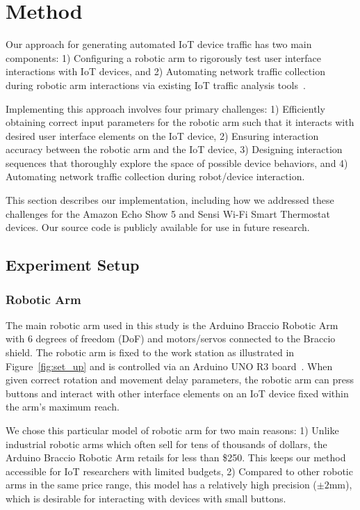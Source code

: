 \section{Method}
\label{sec:method}

Our approach for generating automated IoT device traffic has two main components: 1) Configuring a robotic arm to rigorously test user interface interactions with IoT devices, and 2) Automating network traffic collection during robotic arm interactions via existing IoT traffic analysis tools~\cite{iot_inspector}.

Implementing this approach involves four primary challenges: 1) Efficiently obtaining correct input parameters for the robotic arm such that it interacts with desired user interface elements on the IoT device, 2) Ensuring interaction accuracy between the robotic arm and the IoT device, 3) Designing interaction sequences that thoroughly explore the space of possible device behaviors, and 4) Automating network traffic collection during robot/device interaction. 

This section describes our implementation, including how we addressed these challenges for the Amazon Echo Show 5 and Sensi Wi-Fi Smart Thermostat devices. Our source code is publicly available for use in future research.

\subsection{Experiment Setup}
\label{sec:experiment-setup}
\subsubsection{Robotic Arm} The main robotic arm used in this study is the Arduino Braccio Robotic Arm~\cite{braccio} with 6 degrees of freedom (DoF) and motors/servos connected to the Braccio shield. The robotic arm is fixed to the work station as illustrated in Figure~\ref{fig:set_up} and is controlled via an Arduino UNO R3 board~\cite{r3}. 
When given correct rotation and movement delay parameters, the robotic arm can press buttons and interact with other interface elements on an IoT device fixed within the arm's maximum reach.

We chose this particular model of robotic arm for two main reasons: 1) Unlike industrial robotic arms which often sell for tens of thousands of dollars, the Arduino Braccio Robotic Arm retails for less than \$250. This keeps our method accessible for IoT researchers with limited budgets, 2) Compared to other robotic arms in the same price range, this model has a relatively high precision ($\pm2$mm), which is desirable for interacting with devices with small buttons.


